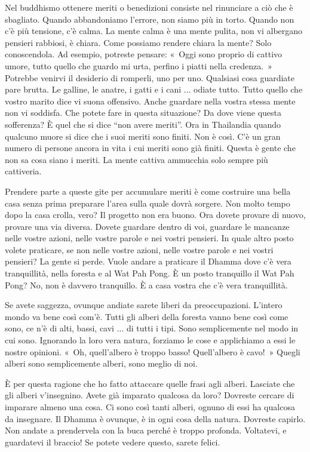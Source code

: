 Nel buddhismo ottenere meriti o benedizioni consiste nel rinunciare a
ciò che è sbagliato. Quando abbandoniamo l'errore, non siamo più in
torto. Quando non c'è più tensione, c'è calma. La mente calma è una
mente pulita, non vi albergano pensieri rabbiosi, è chiara. Come
possiamo rendere chiara la mente? Solo conoscendola. Ad esempio,
potreste pensare: «~Oggi sono proprio di cattivo umore, tutto quello che
guardo mi urta, perfino i piatti nella credenza.~» Potrebbe venirvi il
desiderio di romperli, uno per uno. Qualsiasi cosa guardiate pare
brutta. Le galline, le anatre, i gatti e i cani ... odiate tutto. Tutto
quello che vostro marito dice vi suona offensivo. Anche guardare nella
vostra stessa mente non vi soddisfa. Che potete fare in questa
situazione? Da dove viene questa sofferenza? È quel che si dice ``non
avere meriti''. Ora in Thailandia quando qualcuno muore si dice che i
suoi meriti sono finiti. Non è così. C'è un gran numero di persone
ancora in vita i cui meriti sono già finiti. Questa è gente che non sa
cosa siano i meriti. La mente cattiva ammucchia solo sempre più
cattiveria.

Prendere parte a queste gite per accumulare meriti è come costruire una
bella casa senza prima preparare l'area sulla quale dovrà sorgere. Non
molto tempo dopo la casa crolla, vero? Il progetto non era buono. Ora
dovete provare di nuovo, provare una via diversa. Dovete guardare dentro
di voi, guardare le mancanze nelle vostre azioni, nelle vostre parole e
nei vostri pensieri. In quale altro posto volete praticare, se non nelle
vostre azioni, nelle vostre parole e nei vostri pensieri? La gente si
perde. Vuole andare a praticare il Dhamma dove c'è vera tranquillità,
nella foresta e al Wat Pah Pong. È un posto tranquillo il Wat Pah Pong?
No, non è davvero tranquillo. È a casa vostra che c'è vera tranquillità.

Se avete saggezza, ovunque andiate sarete liberi da preoccupazioni.
L'intero mondo va bene così com'è. Tutti gli alberi della foresta vanno
bene così come sono, ce n'è di alti, bassi, cavi ... di tutti i tipi.
Sono semplicemente nel modo in cui sono. Ignorando la loro vera natura,
forziamo le cose e applichiamo a essi le nostre opinioni. «~Oh,
quell'albero è troppo basso! Quell'albero è cavo!~» Quegli alberi sono
semplicemente alberi, sono meglio di noi.

È per questa ragione che ho fatto attaccare quelle frasi agli alberi.
Lasciate che gli alberi v'insegnino. Avete già imparato qualcosa da
loro? Dovreste cercare di imparare almeno una cosa. Ci sono così tanti
alberi, ognuno di essi ha qualcosa da insegnare. Il Dhamma è ovunque, è
in ogni cosa della natura. Dovreste capirlo. Non andate a prendervela
con la buca perché è troppo profonda. Voltatevi, e guardatevi il
braccio! Se potete vedere questo, sarete felici.

